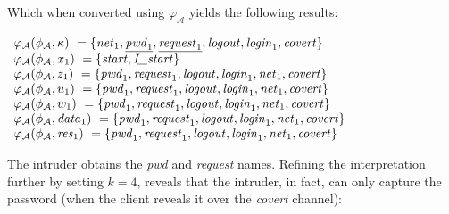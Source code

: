 \documentclass[10pt,a4paper,final,oneside,fleqn]{book}
\begin{document}
\noindent
Which when converted using $\varphi_\mathcal{A}$ yields the following results:\vspace{6mm}

\noindent
$\begin{array}{l}
\varphi_\mathcal{A}(\phi_\mathcal{A},\kappa)~=\{\mbox{{\itshape net\/}}_1, \underline{\mbox{{\itshape pwd\/}}_1}, \underline{\mbox{{\itshape request\/}}_1}, \mbox{{\itshape logout\/}}, \mbox{{\itshape login\/}}_1, \mbox{{\itshape covert\/}}\}\\
\varphi_\mathcal{A}(\phi_\mathcal{A},x_1)~=\{\mbox{{\itshape start\/}}, \mbox{{\itshape I\_start\/}}\}\\
\varphi_\mathcal{A}(\phi_\mathcal{A},z_1)~=\{\mbox{{\itshape pwd\/}}_1, \mbox{{\itshape request\/}}_1,\mbox{{\itshape logout\/}},\mbox{{\itshape login\/}}_1,\mbox{{\itshape net\/}}_1, \mbox{{\itshape covert\/}}\}\\
\varphi_\mathcal{A}(\phi_\mathcal{A},u_1)~=\{\mbox{{\itshape pwd\/}}_1, \mbox{{\itshape request\/}}_1,\mbox{{\itshape logout\/}},\mbox{{\itshape login\/}}_1,\mbox{{\itshape net\/}}_1, \mbox{{\itshape covert\/}}\}\\
\varphi_\mathcal{A}(\phi_\mathcal{A},w_1)~=\{\mbox{{\itshape pwd\/}}_1, \mbox{{\itshape request\/}}_1,\mbox{{\itshape logout\/}},\mbox{{\itshape login\/}}_1,\mbox{{\itshape net\/}}_1, \mbox{{\itshape covert\/}}\}\\
\varphi_\mathcal{A}(\phi_\mathcal{A},\mbox{{\itshape data\/}}_1)~=\{\mbox{{\itshape pwd\/}}_1, \mbox{{\itshape request\/}}_1, \mbox{{\itshape logout\/}},\mbox{{\itshape login\/}}_1,\mbox{{\itshape net\/}}_1, \mbox{{\itshape covert\/}}\}\\
\varphi_\mathcal{A}(\phi_\mathcal{A},\mbox{{\itshape res\/}}_1)~=\{\mbox{{\itshape pwd\/}}_1, \mbox{{\itshape request\/}}_1, \mbox{{\itshape logout\/}},\mbox{{\itshape login\/}}_1,\mbox{{\itshape net\/}}_1, \mbox{{\itshape covert\/}}\}
\end{array}$\vspace{6mm}

\noindent
The intruder obtains the {\itshape pwd\/} and {\itshape request\/} names.  Refining the interpretation further by setting $k=4$, reveals that the intruder, in fact, can only capture the password (when the client reveals it over the {\itshape covert\/} channel):\vspace{6mm}
\end{document}
